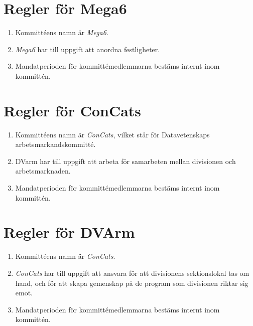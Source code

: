 \documentclass{dvd}
\begin{document}
\section{Regler för Mega6}

	\begin{enumerate}[label=\arabic* §, ref=\arabic*]
		\item Kommittéens namn är \emph{Mega6}.

		\item \emph{Mega6} har till uppgift att anordna festligheter.

		\item Mandatperioden för kommittémedlemmarna bestäms internt inom kommittén.

	\end{enumerate}

\section{Regler för ConCats}

	\begin{enumerate}[label=\arabic* §, ref=\arabic*]
		\item Kommittéens namn är \emph{ConCats}, vilket står för Datavetenskaps arbetsmarkandskommitté.

		\item DVarm har till uppgift att arbeta för samarbeten mellan divisionen och arbetsmarknaden.

		\item Mandatperioden för kommittémedlemmarna bestäms internt inom kommittén.

	\end{enumerate}

\section{Regler för DVArm}

	\begin{enumerate}[label=\arabic* §, ref=\arabic*]
		\item Kommittéens namn är \emph{ConCats}.

		\item \emph{ConCats} har till uppgift att ansvara för att divisionens sektionslokal tas om hand, och för att skapa gemenskap på de program som divisionen riktar sig emot.

		\item Mandatperioden för kommittémedlemmarna bestäms internt inom kommittén.

	\end{enumerate}
\end{document}
